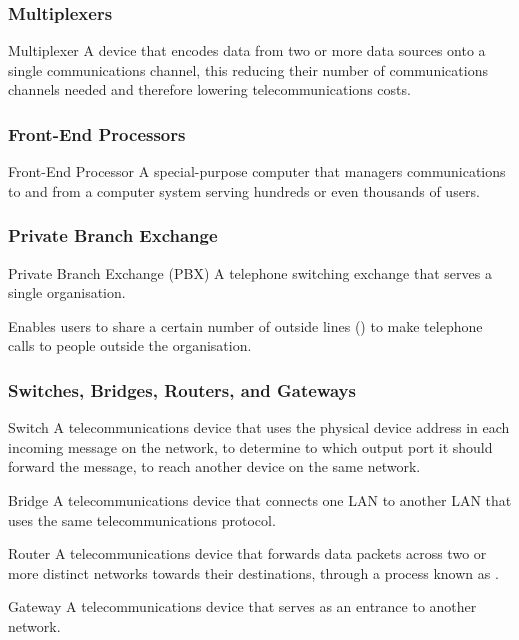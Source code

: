 \documentclass[\main/notes.tex]{subfiles}
\begin{document}
				\subsubsection{Multiplexers}
					\begin{definition}{Multiplexer}
						A device that encodes data from two or more data sources onto a single communications channel, this reducing their number of communications channels needed and therefore lowering telecommunications costs.
					\end{definition}
				\subsubsection{Front-End Processors}
					\begin{definition}{Front-End Processor}
						A special-purpose computer that managers communications to and from a computer system serving hundreds or even thousands of users.
					\end{definition}
				\subsubsection{Private Branch Exchange}
					\begin{definition}{Private Branch Exchange (PBX)}
						A telephone switching exchange that serves a single organisation.

						Enables users to share a certain number of outside lines () to make telephone calls to people outside the organisation.
					\end{definition}
				\subsubsection{Switches, Bridges, Routers, and Gateways}
					\begin{definition}{Switch}
						A telecommunications device that uses the physical device address in each incoming message on the network, to determine to which output port it should forward the message, to reach another device on the same network.
					\end{definition}
					\begin{definition}{Bridge}
						A telecommunications device that connects one LAN to another LAN that uses the same telecommunications protocol.
					\end{definition}
					\begin{definition}{Router}
						A telecommunications device that forwards data packets across two or more distinct networks towards their destinations, through a process known as .
					\end{definition}
					\begin{definition}{Gateway}
						A telecommunications device that serves as an entrance to another network.
					\end{definition}

	\vbox{}
\end{document}

